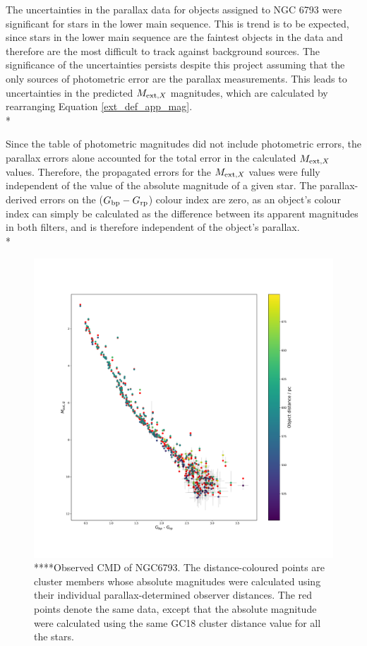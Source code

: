 \documentclass[12pt, a4paper]{report}
\begin{document}
The uncertainties in the parallax data for objects assigned to NGC 6793 were significant for stars in the lower main sequence. This is trend is to be expected, since stars in the lower main sequence are the faintest objects in the data and therefore are the most difficult to track against background sources. The significance of the uncertainties persists despite this project assuming that the only sources of photometric error are the parallax measurements. This leads to uncertainties in the predicted $M_{\textnormal{ext},X}$ magnitudes, which are calculated by rearranging Equation \ref{ext_def_app_mag}.\\*

Since the table of photometric magnitudes did not include photometric errors, the parallax errors alone accounted for the total error in the calculated $M_{\textnormal{ext},X}$ values. Therefore, the propagated errors for the $M_{\textnormal{ext},X}$ values were fully independent of the value of the absolute magnitude of a given star. The parallax-derived errors on the ($G_{\textnormal{bp}}-G_{\textnormal{rp}}$) colour index are zero, as an object's colour index can simply be calculated as the difference between its apparent magnitudes in both filters, and is therefore independent of the object's parallax.\\*

\begin{figure}[h!]
\begin{center}
\includegraphics[width=1.0\textwidth]{../NGC_6793_CMD_Myr_single_distance_plx_selected_vizier.pdf}
\caption{****Observed CMD of NGC6793. The distance-coloured points are cluster members whose absolute magnitudes were calculated using their individual parallax-determined observer distances. The red points denote the same data, except that the absolute magnitude were calculated using the same GC18 cluster distance value for all the stars.}
\label{indiv_vs_single_distance_check}
\end{center}
\end{figure}
\end{document}
